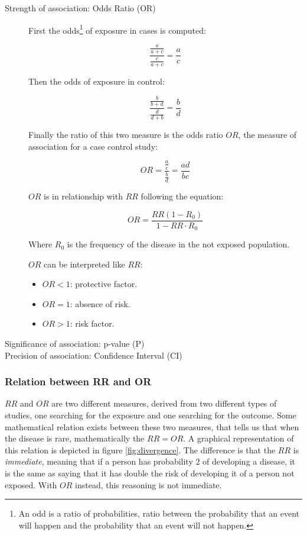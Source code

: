 		\begin{description}
		\item[Strength of association: Odds Ratio (OR)]
		First the odds\footnote{An odd is a ratio of probabilities, ratio between the probability that an event will happen and the probability that an event will not happen.} of exposure in cases is computed:

		$$\frac{\frac{a}{a+c}}{\frac{c}{a+c}} = \frac{a}{c}$$

		Then the odds of exposure in control:

		$$\frac{\frac{b}{b+d}}{\frac{d}{d+b}} = \frac{b}{d}$$

		Finally the ratio of this two measure is the odds ratio $OR$, the measure of association for a case control study:

		$$OR = \frac{\frac{a}{c}}{\frac{b}{d}} = \frac{ad}{bc}$$

		$OR$ is in relationship with $RR$ following the equation:

		$$OR = \frac{RR(1-R_0)}{1-RR\cdot R_0}$$

		Where $R_0$ is the frequency of the disease in the not exposed population.

		$OR$ can be interpreted like $RR$:

		\begin{multicols}{3}
			\begin{itemize}
				\item $OR <1$: protective factor.
				\item $OR = 1$: absence of risk.
				\item $OR > 1$: risk factor.
			\end{itemize}
		\end{multicols}
		
		\item[Significance of association: p-value (P)]
		\item[Precision of association: Confidence Interval (CI)]
		\end{description}
		
		\subsubsection*{Relation between RR and OR}
		$RR$ and $OR$ are two different measures, derived from two different types of studies, one searching for the exposure and one searching for the outcome.
		Some mathematical relation exists between these two measures, that tells us that when the disease is rare, mathematically the $RR = OR$. 
		A graphical representation of this relation is depicted in figure \ref{fig:divergence}.
		The difference is that the $RR$ is \textit{immediate}, meaning that if a person has probability $2$ of developing a disease, it is the same as saying that it has double the risk of developing it of a person not exposed. 
		With $OR$ instead, this reasoning is not immediate.
		
